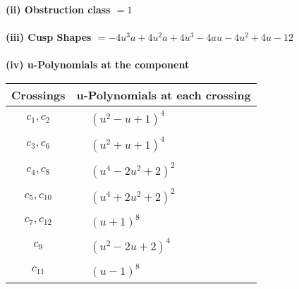 \documentclass[1p]{elsarticle_modified}
\theoremstyle{definition}
\begin{document}
\flushleft \textbf{(ii) Obstruction class $= 1$}\\~\\
\flushleft \textbf{(iii) Cusp Shapes $= -4 u^3 a+4 u^2 a+4 u^3-4 a u-4 u^2+4 u-12$}\\~\\
\newpage\renewcommand{\arraystretch}{1}
\flushleft \textbf{(iv) u-Polynomials at the component}\newline \\
\begin{tabular}{m{50pt}|m{274pt}}
Crossings & \hspace{64pt}u-Polynomials at each crossing \\
\hline $$\begin{aligned}c_{1},c_{2}\end{aligned}$$&$\begin{aligned}
&(u^2- u+1)^4
\end{aligned}$\\
\hline $$\begin{aligned}c_{3},c_{6}\end{aligned}$$&$\begin{aligned}
&(u^2+u+1)^4
\end{aligned}$\\
\hline $$\begin{aligned}c_{4},c_{8}\end{aligned}$$&$\begin{aligned}
&(u^4-2 u^2+2)^2
\end{aligned}$\\
\hline $$\begin{aligned}c_{5},c_{10}\end{aligned}$$&$\begin{aligned}
&(u^4+2 u^2+2)^2
\end{aligned}$\\
\hline $$\begin{aligned}c_{7},c_{12}\end{aligned}$$&$\begin{aligned}
&(u+1)^8
\end{aligned}$\\
\hline $$\begin{aligned}c_{9}\end{aligned}$$&$\begin{aligned}
&(u^2-2 u+2)^4
\end{aligned}$\\
\hline $$\begin{aligned}c_{11}\end{aligned}$$&$\begin{aligned}
&(u-1)^8
\end{aligned}$\\
\hline
\end{tabular}\\~\\
\end{document}
